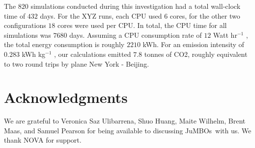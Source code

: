\documentclass[submission,phys]{lib/SciPost}
\newcommand{\jumbos}{\mbox{JuMBOs}}
\begin{document}
The $820$ simulations conducted during this investigation had a total
wall-clock time of $432$ days. For the XYZ runs, each CPU used $6$
cores, for the other two configurations $18$ cores were used per
CPU. In total, the CPU time for all simulations was $7680$
days. Assuming a CPU consumption rate of $12$ Watt hr$^{-1}$
\cite{2020NatAs...4..819P}, the total energy consumption is roughly
$2210$ kWh. For an emission intensity of $0.283$ kWh kg$^{-1}$
\cite{doi:10.1002/cpe.3489}, our calculations emitted $7.8$ tonnes of
CO2, roughly equivalent to two round trips by plane New York -
Beijing.

\section*{Acknowledgments}
We are grateful to Veronica Saz Ulibarrena, Shuo Huang, Maite Wilhelm,
Brent Maas, and Samuel Pearson for being available to discussing
\jumbos\, with us.
We thank NOVA for support.

%
%

\end{document}
